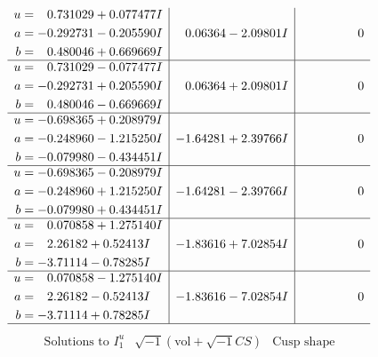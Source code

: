 \documentclass[1p]{elsarticle_modified}
\theoremstyle{definition}
\newcommand{\I}{\sqrt{-1}}
\begin{document}
$$\begin{array}{c|c|c}
\begin{aligned}
u &= \phantom{-}0.731029 + 0.077477 I \\
a &= -0.292731 - 0.205590 I \\
b &= \phantom{-}0.480046 + 0.669669 I\end{aligned}
 & \phantom{-}0.06364 - 2.09801 I & \phantom{-0.000000 } 0 \\ \hline\begin{aligned}
u &= \phantom{-}0.731029 - 0.077477 I \\
a &= -0.292731 + 0.205590 I \\
b &= \phantom{-}0.480046 - 0.669669 I\end{aligned}
 & \phantom{-}0.06364 + 2.09801 I & \phantom{-0.000000 } 0 \\ \hline\begin{aligned}
u &= -0.698365 + 0.208979 I \\
a &= -0.248960 - 1.215250 I \\
b &= -0.079980 - 0.434451 I\end{aligned}
 & -1.64281 + 2.39766 I & \phantom{-0.000000 } 0 \\ \hline\begin{aligned}
u &= -0.698365 - 0.208979 I \\
a &= -0.248960 + 1.215250 I \\
b &= -0.079980 + 0.434451 I\end{aligned}
 & -1.64281 - 2.39766 I & \phantom{-0.000000 } 0 \\ \hline\begin{aligned}
u &= \phantom{-}0.070858 + 1.275140 I \\
a &= \phantom{-}2.26182 + 0.52413 I \\
b &= -3.71114 - 0.78285 I\end{aligned}
 & -1.83616 + 7.02854 I & \phantom{-0.000000 } 0 \\ \hline\begin{aligned}
u &= \phantom{-}0.070858 - 1.275140 I \\
a &= \phantom{-}2.26182 - 0.52413 I \\
b &= -3.71114 + 0.78285 I\end{aligned}
 & -1.83616 - 7.02854 I & \phantom{-0.000000 } 0\\
 \hline 
 \end{array}$$\newpage$$\begin{array}{c|c|c}  
\text{Solutions to }I^u_{1}& \I (\text{vol} + \sqrt{-1}CS) & \text{Cusp shape}\\
 \hline 
\begin{aligned}

\end{aligned}
\end{array}$$
\end{document}
